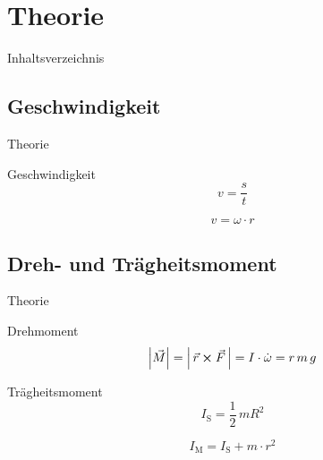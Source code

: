 \section{Theorie}

\begin{frame}{Inhaltsverzeichnis}
\end{frame} 

\subsection{Geschwindigkeit}
\begin{frame}[t]{Theorie}
    \begin{block}{Geschwindigkeit}    
    \begin{equation*}
        v= \frac{s}{t}
    \end{equation*}
    
    \begin{equation*}
        v = \omega \cdot r
    \end{equation*}
\end{block}
\end{frame}

\subsection{Dreh- und Trägheitsmoment}

\begin{frame}[t]{Theorie}
    \begin{block}{Drehmoment}
    \begin{equation}
        \abs{\vec{M}} = \abs{\,\vec{r} \cross \vec{F}\, } = I \cdot \dot{\omega} = r\, m\, g
        \label{eqn:drehmoment}
    \end{equation}
    \end{block}

    \begin{block}{Trägheitsmoment}
    \begin{equation}
        I_\text{S}= \frac{1}{2}\, m R^2 
        \label{eqn:trägheit}
    \end{equation}

    \begin{equation}
        I_\text{M} = I_\text{S}+ m \cdot r^2
        \label{eqn:steiner}
    \end{equation}
    \end{block}
\end{frame}


